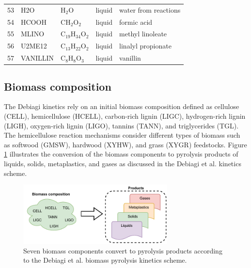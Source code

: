 \documentclass[12pt,titlepage]{article}
\begin{document}
\begin{center}
\begin{longtable}{cllll}
    53 & H2O            & H$_2$O                  & \cellcolor{blue!25}liquid        & water from reactions \\
    54 & HCOOH          & CH$_2$O$_2$             & \cellcolor{blue!25}liquid        & formic acid \\
    55 & MLINO          & C$_{19}$H$_{34}$O$_2$   & \cellcolor{blue!25}liquid        & methyl linoleate \\
    56 & U2ME12         & C$_{13}$H$_{22}$O$_2$   & \cellcolor{blue!25}liquid        & linalyl propionate \\
    57 & VANILLIN       & C$_8$H$_8$O$_3$         & \cellcolor{blue!25}liquid        & vanillin \\
    \bottomrule
\end{longtable}
\end{center}

\subsection{Biomass composition}

The Debiagi kinetics rely on an initial biomass composition defined as cellulose (CELL), hemicellulose (HCELL), carbon-rich lignin (LIGC), hydrogen-rich lignin (LIGH), oxygen-rich lignin (LIGO), tannins (TANN), and triglycerides (TGL). The hemicellulose reaction mechanisms consider different types of biomass such as softwood (GMSW), hardwood (XYHW), and grass (XYGR) feedstocks. Figure \ref{fig:biocomp1} illustrates the conversion of the biomass components to pyrolysis products of liquids, solids, metaplastics, and gases as discussed in the Debiagi et al. kinetics scheme.

\begin{figure}[H]
    \centering
    \includegraphics[width=0.7\textwidth]{figures/biocomp1.pdf}
    \caption{Seven biomass components convert to pyrolysis products according to the Debiagi et al. biomass pyrolysis kinetics scheme.}
    \label{fig:biocomp1}
\end{figure}
\end{document}
